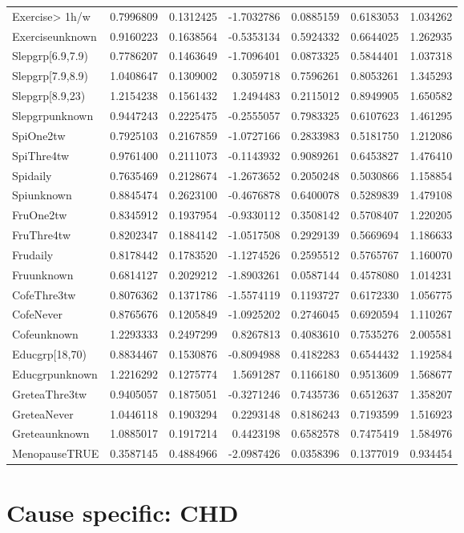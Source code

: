 \documentclass[]{article}
\begin{document}
\begin{longtable}[]{@{}lrrrrrr@{}}
Exercise\textgreater{} 1h/w & 0.7996809 & 0.1312425 & -1.7032786 &
0.0885159 & 0.6183053 & 1.034262\tabularnewline
Exerciseunknown & 0.9160223 & 0.1638564 & -0.5353134 & 0.5924332 &
0.6644025 & 1.262935\tabularnewline
Slepgrp{[}6.9,7.9) & 0.7786207 & 0.1463649 & -1.7096401 & 0.0873325 &
0.5844401 & 1.037318\tabularnewline
Slepgrp{[}7.9,8.9) & 1.0408647 & 0.1309002 & 0.3059718 & 0.7596261 &
0.8053261 & 1.345293\tabularnewline
Slepgrp{[}8.9,23) & 1.2154238 & 0.1561432 & 1.2494483 & 0.2115012 &
0.8949905 & 1.650582\tabularnewline
Slepgrpunknown & 0.9447243 & 0.2225475 & -0.2555057 & 0.7983325 &
0.6107623 & 1.461295\tabularnewline
SpiOne2tw & 0.7925103 & 0.2167859 & -1.0727166 & 0.2833983 & 0.5181750 &
1.212086\tabularnewline
SpiThre4tw & 0.9761400 & 0.2111073 & -0.1143932 & 0.9089261 & 0.6453827
& 1.476410\tabularnewline
Spidaily & 0.7635469 & 0.2128674 & -1.2673652 & 0.2050248 & 0.5030866 &
1.158854\tabularnewline
Spiunknown & 0.8845474 & 0.2623100 & -0.4676878 & 0.6400078 & 0.5289839
& 1.479108\tabularnewline
FruOne2tw & 0.8345912 & 0.1937954 & -0.9330112 & 0.3508142 & 0.5708407 &
1.220205\tabularnewline
FruThre4tw & 0.8202347 & 0.1884142 & -1.0517508 & 0.2929139 & 0.5669694
& 1.186633\tabularnewline
Frudaily & 0.8178442 & 0.1783520 & -1.1274526 & 0.2595512 & 0.5765767 &
1.160070\tabularnewline
Fruunknown & 0.6814127 & 0.2029212 & -1.8903261 & 0.0587144 & 0.4578080
& 1.014231\tabularnewline
CofeThre3tw & 0.8076362 & 0.1371786 & -1.5574119 & 0.1193727 & 0.6172330
& 1.056775\tabularnewline
CofeNever & 0.8765676 & 0.1205849 & -1.0925202 & 0.2746045 & 0.6920594 &
1.110267\tabularnewline
Cofeunknown & 1.2293333 & 0.2497299 & 0.8267813 & 0.4083610 & 0.7535276
& 2.005581\tabularnewline
Educgrp{[}18,70) & 0.8834467 & 0.1530876 & -0.8094988 & 0.4182283 &
0.6544432 & 1.192584\tabularnewline
Educgrpunknown & 1.2216292 & 0.1275774 & 1.5691287 & 0.1166180 &
0.9513609 & 1.568677\tabularnewline
GreteaThre3tw & 0.9405057 & 0.1875051 & -0.3271246 & 0.7435736 &
0.6512637 & 1.358207\tabularnewline
GreteaNever & 1.0446118 & 0.1903294 & 0.2293148 & 0.8186243 & 0.7193599
& 1.516923\tabularnewline
Greteaunknown & 1.0885017 & 0.1917214 & 0.4423198 & 0.6582578 &
0.7475419 & 1.584976\tabularnewline
MenopauseTRUE & 0.3587145 & 0.4884966 & -2.0987426 & 0.0358396 &
0.1377019 & 0.934454\tabularnewline
\bottomrule
\end{longtable}

\hypertarget{cause-specific-chd}{%
\section{Cause specific: CHD}\label{cause-specific-chd}}
\end{document}
